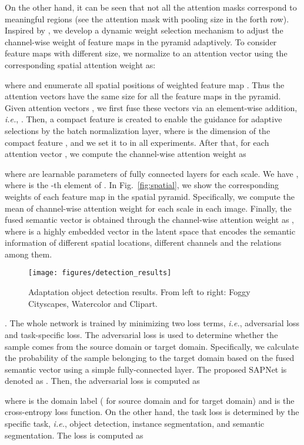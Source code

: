 \documentclass[runningheads]{llncs}
\def\ie{{\em i.e.}}
\begin{document}
On the other hand, it can be seen that not all the attention masks correspond to meaningful regions (see the attention mask with pooling size  in the forth row). Inspired by \cite{DBLP:conf/cvpr/LiW0019}, we develop a dynamic weight selection mechanism to adjust the channel-wise weight of feature maps in the pyramid adaptively. To consider feature maps with different size, we normalize  to an attention vector  using the corresponding spatial attention weight  as:

where  and  enumerate all spatial positions of weighted feature map . Thus the attention vectors have the same size for all the feature maps in the pyramid. Given attention vectors , we first fuse these vectors via an element-wise addition, \ie, . Then, a compact feature  is created to enable the guidance for adaptive selections by the batch normalization layer, where  is the dimension of the compact feature , and we set it to  in all experiments. After that, for each attention vector , we compute the channel-wise attention weight  as

where  are learnable parameters of fully connected layers for each scale. We have , where  is the -th element of . In Fig.~\ref{fig:spatial}, we show the corresponding weights of each feature map in the spatial pyramid. Specifically, we compute the mean of channel-wise attention weight  for each scale in each image. Finally, the fused semantic vector  is obtained through the channel-wise attention weight as , where  is a highly embedded vector in the latent space that encodes the semantic information of different spatial locations, different channels and the relations among them.
\begin{figure}[t]
\centering
\texttt{[image: figures/detection\_results]}
\caption{Adaptation object detection results. From left to right: Foggy Cityscapes, Watercolor and Clipart.}
\label{fig:detection}
\end{figure}

{.}
The whole network is trained by minimizing two loss terms, \ie, adversarial loss and task-specific loss. The adversarial loss is used to determine whether the sample comes from the source domain or target domain. Specifically, we calculate the probability  of the sample belonging to the target domain based on the fused semantic vector  using a simple fully-connected layer. The proposed SAPNet is denoted as . Then, the adversarial loss is computed as

where  is the domain label ( for source domain and  for target domain) and  is the cross-entropy loss function. On the other hand, the task loss  is determined by the specific task, \ie, object detection, instance segmentation, and semantic segmentation. The loss is computed as
\end{document}
